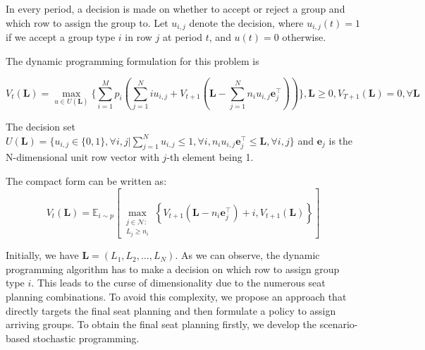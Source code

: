 In every period, a decision is made on whether to accept or reject a group and which row to assign the group to. Let $u_{i,j}$ denote the decision, where $u_{i,j}(t) = 1$ if we accept a group type $i$ in row $j$ at period $t$, and $u(t) = 0$ otherwise.

The dynamic programming formulation for this problem is

$$V_{t}(\mathbf{L}) = \max_{u \in U(\mathbf{L})}\{ \sum_{i=1}^{M} p_i ( \sum_{j=1}^{N} i u_{i,j} + V_{t+1}(\mathbf{L}- \sum_{j=1}^{N} n_i u_{i,j}\mathbf{e}_j^{\top} ))\}, \mathbf{L} \geq 0, V_{T+1}(\mathbf{L}) =0, \forall \mathbf{L}$$

The decision set $U(\mathbf{L}) = \{u_{i,j} \in\{0,1\}, \forall i,j| \sum_{j=1}^{N} u_{i,j} \leq 1, \forall i, n_{i}u_{i,j}\mathbf{e}_j^{\top} \leq \mathbf{L}, \forall i,j \}$ and $\mathbf{e}_j$ is the N-dimensional unit row vector with $j$-th element being 1.

The compact form can be written as:
$$V_{t}(\mathbf{L}) = \mathbb{E}_{i \sim p}\left[\max_{\substack{j \in \mathcal{N}: \\ L_j \geqslant n_{i}}}\left\{V_{t+1}\left(\mathbf{L}- n_{i}\mathbf{e}_j^{\top} \right)+ i, V_{t+1}(\mathbf{L})\right\}\right]$$

Initially, we have $\mathbf{L} = (L_1, L_2, \ldots, L_{N})$. As we can observe, the dynamic programming algorithm has to make a decision on which row to assign group type $i$. This leads to the curse of dimensionality due to the numerous seat planning combinations. To avoid this complexity, we propose an approach that directly targets the final seat planning and then formulate a policy to assign arriving groups. To obtain the final seat planning firstly, we develop the scenario-based stochastic programming.


